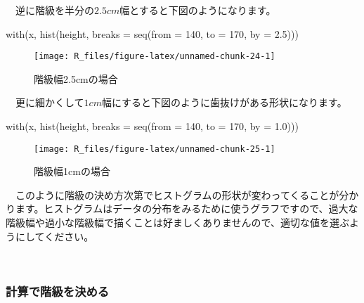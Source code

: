 \documentclass[
  12pt,
]{book}
\newenvironment{Shaded}{\begin{snugshade}}{\end{snugshade}}
\newcommand{\AttributeTok}[1]{\textcolor[rgb]{0.77,0.63,0.00}{#1}}
\newcommand{\DecValTok}[1]{\textcolor[rgb]{0.00,0.00,0.81}{#1}}
\newcommand{\FloatTok}[1]{\textcolor[rgb]{0.00,0.00,0.81}{#1}}
\newcommand{\FunctionTok}[1]{\textcolor[rgb]{0.00,0.00,0.00}{#1}}
\newcommand{\NormalTok}[1]{#1}
\begin{document}
　逆に階級を半分の\(2.5cm\)幅とすると下図のようになります。

\begin{Shaded}
\begin{Highlighting}[]
\FunctionTok{with}\NormalTok{(x, }\FunctionTok{hist}\NormalTok{(height, }\AttributeTok{breaks =} \FunctionTok{seq}\NormalTok{(}\AttributeTok{from =} \DecValTok{140}\NormalTok{, }\AttributeTok{to =} \DecValTok{170}\NormalTok{, }\AttributeTok{by =} \FloatTok{2.5}\NormalTok{)))}
\end{Highlighting}
\end{Shaded}

\begin{figure}[H]

{\centering \texttt{[image: R\_files/figure-latex/unnamed-chunk-24-1]} 

}

\caption{階級幅2.5cmの場合}\label{fig:unnamed-chunk-24}
\end{figure}

　更に細かくして\(1cm\)幅にすると下図のように歯抜けがある形状になります。

\begin{Shaded}
\begin{Highlighting}[]
\FunctionTok{with}\NormalTok{(x, }\FunctionTok{hist}\NormalTok{(height, }\AttributeTok{breaks =} \FunctionTok{seq}\NormalTok{(}\AttributeTok{from =} \DecValTok{140}\NormalTok{, }\AttributeTok{to =} \DecValTok{170}\NormalTok{, }\AttributeTok{by =} \FloatTok{1.0}\NormalTok{)))}
\end{Highlighting}
\end{Shaded}

\begin{figure}[H]

{\centering \texttt{[image: R\_files/figure-latex/unnamed-chunk-25-1]} 

}

\caption{階級幅1cmの場合}\label{fig:unnamed-chunk-25}
\end{figure}

　このように階級の決め方次第でヒストグラムの形状が変わってくることが分かります。ヒストグラムはデータの分布をみるために使うグラフですので、過大な階級幅や過小な階級幅で描くことは好ましくありませんので、適切な値を選ぶようにしてください。

　

\hypertarget{ux8a08ux7b97ux3067ux968eux7d1aux3092ux6c7aux3081ux308b}{%
\subsubsection*{計算で階級を決める}\label{ux8a08ux7b97ux3067ux968eux7d1aux3092ux6c7aux3081ux308b}}
\end{document}

